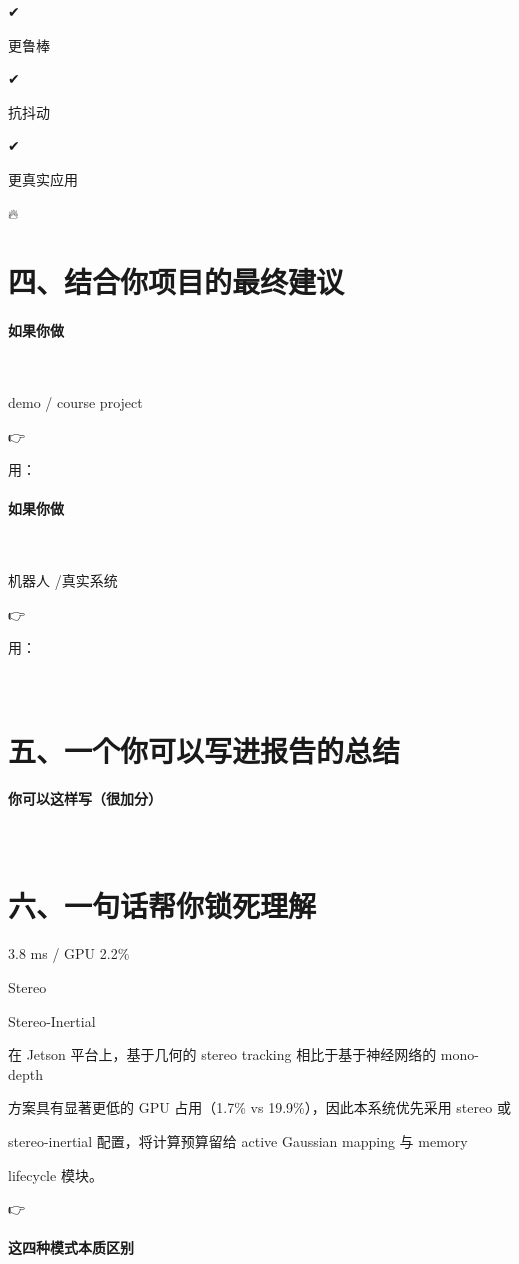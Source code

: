 \documentclass[12pt]{article}
\begin{document}
✔

更鲁棒

✔

抗抖动

✔

更真实应用

🔥

\section{四、结合你项目的最终建议}
\paragraph{如果你做}
🧪

demo / course project

👉

用：

\paragraph{如果你做}
🤖

机器人 /真实系统

👉

用：

🧩

\section{五、一个你可以写进报告的总结}
\paragraph{你可以这样写（很加分）}
🧭

\section{六、一句话帮你锁死理解}
3.8 ms / GPU 2.2\%

Stereo

Stereo-Inertial

在 Jetson 平台上，基于几何的 stereo tracking 相比于基于神经网络的 mono-depth

方案具有显著更低的 GPU 占用（1.7\% vs 19.9\%），因此本系统优先采用 stereo 或

stereo-inertial 配置，将计算预算留给 active Gaussian mapping 与 memory

lifecycle 模块。

👉

\paragraph{这四种模式本质区别}
\end{document}
